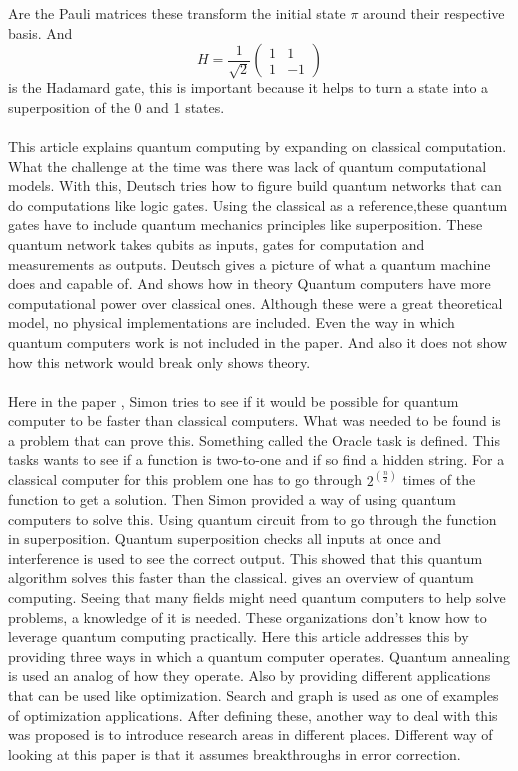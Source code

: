 \documentclass[15pt, a4paper]{Assignment}
\begin{document}
Are the Pauli matrices these transform the initial state $\pi$ around their respective basis.
And \begin{equation}H=\frac{1}{\sqrt{2}}
	\begin{pmatrix}
		1&1\\1&-1
	\end{pmatrix}
\end{equation} is the Hadamard gate, this is important because it helps to turn a state into a superposition of the 0 and 1 states.
\\
\\
This article \cite{Deutsch1989} explains quantum computing by expanding on classical computation.
What the challenge at the time was there was lack of quantum computational models.
With this, Deutsch tries how to figure build quantum networks that can do computations like logic gates.
Using the classical as a reference,these quantum gates have to include quantum mechanics principles like superposition.
These quantum network takes qubits as inputs, gates for computation and measurements as outputs.
Deutsch gives a picture of what a quantum machine does and capable of.
And shows how in theory Quantum computers have more computational power over classical ones.
Although these were a great theoretical model, no physical implementations are included.
Even the way in which quantum computers work is not included in the paper.
And also it does not show how this network would break only shows theory.
\\\\
Here in the paper \cite{doi:10.1137/S0097539796298637}, Simon tries to see if it would be possible for quantum computer to be faster than classical computers.
What was needed to be found is a problem that can prove this.
Something called the Oracle task is defined.
This tasks wants to see if a function is two-to-one and if so find a hidden string.
For a classical computer for this problem one has to go through $ 2^{\left(\frac{n}{2}\right)}$ times of the function to get a solution. 
Then Simon provided a way of using quantum computers to solve this.
Using quantum circuit from \cite{Deutsch1989} to go through the function in superposition.
Quantum superposition checks all inputs at once and interference is used to see the correct output.
This showed that this quantum algorithm solves this faster than the classical.
\newpage
\cite{rietsche2022quantum} gives an overview of quantum computing.
Seeing that many fields might need quantum computers to help solve problems, a knowledge of it is needed.
These organizations don’t know how to leverage quantum computing practically.
Here this article addresses this by providing three ways in which a quantum computer operates.
Quantum annealing is used an analog of how they operate.
Also by providing different applications that can be used like optimization.
Search and graph is used as one of examples of optimization applications.
After defining these, another way to deal with this was proposed is to introduce research areas in different places.
Different way of looking at this paper is that it assumes breakthroughs in error correction.
\newpage
\end{document}
